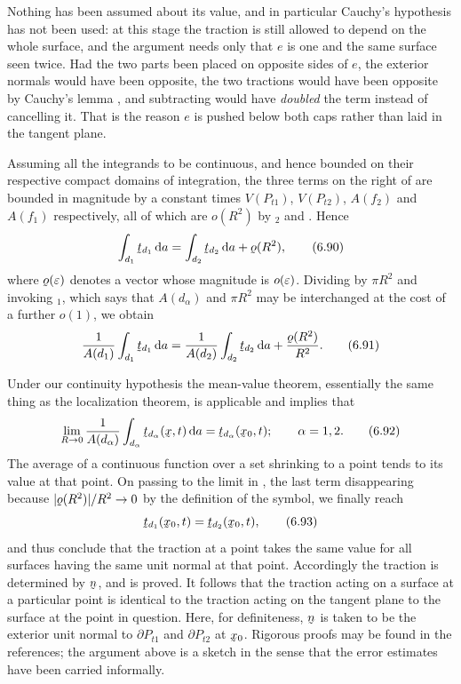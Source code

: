 Nothing has been assumed about its value, and in particular Cauchy's
hypothesis has not been used: at this stage the traction is still
allowed to depend on the whole surface, and the argument needs only
that $e$ is one and the same surface seen twice. Had the two parts been
placed on opposite sides of $e$, the exterior normals would have been
opposite, the two tractions would have been opposite by Cauchy's lemma
, and subtracting would have \emph{doubled} the term instead
of cancelling it. That is the reason $e$ is pushed below both caps
rather than laid in the tangent plane.

Assuming all the integrands to be continuous, and hence bounded on
their respective compact domains of integration, the three terms on the
right of  are bounded in magnitude by a constant times
$V(P_{t1})$, $V(P_{t2})$, $A(f_{2})$ and $A(f_{1})$ respectively, all
of which are $o(R^{2})$ by $_{2}$ and . Hence
\begin{equation}
   \int_{d_{1}}\bt_{d_{1}}\,\dl a=\int_{d_{2}}\bt_{d_{2}}\,\dl a
   +\vek{o}(R^{2}),
   \tag{6.90}\label{eq:6.90}
\end{equation}
where $\vek{o}(\eps)$ denotes a vector whose magnitude is $o(\varepsilon)$.
Dividing by $\pi R^{2}$ and invoking $_{1}$, which says that
$A(d_{\alpha})$ and $\pi R^{2}$ may be interchanged at the cost of a
further $o(1)$, we obtain
\begin{equation}
   \frac{1}{A(d_{1})}\int_{d_{1}}\bt_{d_{1}}\,\dl a
   =\frac{1}{A(d_{2})}\int_{d_{2}}\bt_{d_{2}}\,\dl a
   +\frac{\vek{o}(R^{2})}{R^{2}} .
   \tag{6.91}\label{eq:6.91}
\end{equation}

Under our continuity hypothesis the mean-value theorem, essentially the
same thing as the localization theorem, is applicable and implies that
\begin{equation}
   \lim_{R\to0}\frac{1}{A(d_{\alpha})}
   \int_{d_{\alpha}}\bt_{d_{\alpha}}(\bx,t)\,\dl a
   =\bt_{d_{\alpha}}(\bx_{0},t);\qquad\alpha=1,2 .
   \tag{6.92}\label{eq:6.92}
\end{equation}
The average of a continuous function over a set shrinking to a point
tends to its value at that point. On passing to the limit in
, the last term disappearing because
$|\vek{o}(R^{2})|/R^{2}\to0$ by the definition of the symbol, we
finally reach
\begin{equation}
   \bt_{d_{1}}(\bx_{0},t)=\bt_{d_{2}}(\bx_{0},t),
   \tag{6.93}\label{eq:6.93}
\end{equation}
and thus conclude that the traction at a point takes the same value for
all surfaces having the same unit normal at that point. Accordingly the
traction is determined by $\bn$, and  is proved. It follows
that the traction acting on a surface at a particular point is
identical to the traction acting on the tangent plane to the surface at
the point in question. Here, for definiteness, $\bn$ is taken to be the
exterior unit normal to $\partial P_{t1}$ and $\partial P_{t2}$ at
$\bx_{0}$. Rigorous proofs may be found in the references; the argument
above is a sketch in the sense that the error estimates have been
carried informally.

